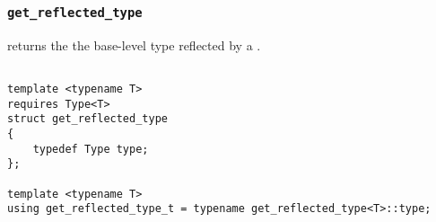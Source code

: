 
\subsubsection{\texttt{get\_reflected\_type}}

returns the the base-level type reflected by a .

\begin{verbatim}

template <typename T>
requires Type<T>
struct get_reflected_type
{
	typedef Type type;
};
	
template <typename T>
using get_reflected_type_t = typename get_reflected_type<T>::type;

\end{verbatim}
